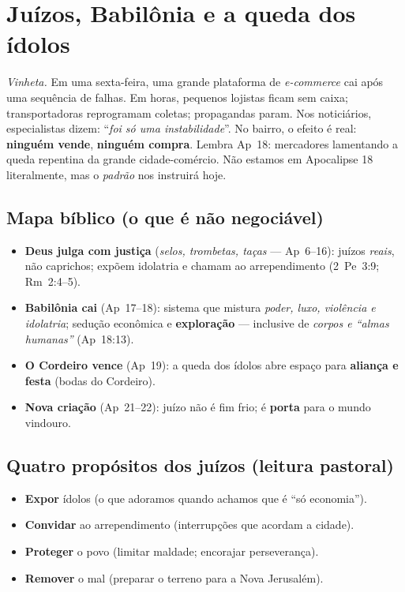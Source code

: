 \chapter{Juízos, Babilônia e a queda dos ídolos}
\noindent\textit{Vinheta.} Em uma sexta-feira, uma grande plataforma de \emph{e-commerce} cai após uma sequência de falhas. Em horas, pequenos lojistas ficam sem caixa; transportadoras reprogramam coletas; propagandas param. Nos noticiários, especialistas dizem: ``\emph{foi só uma instabilidade}''. No bairro, o efeito é real: \textbf{ninguém vende}, \textbf{ninguém compra}. Lembra Ap~18: mercadores lamentando a queda repentina da grande cidade-comércio. Não estamos em Apocalipse 18 literalmente, mas o \emph{padrão} nos instruirá hoje.

\section{Mapa bíblico (o que é não negociável)}
\begin{itemize}[leftmargin=*,noitemsep]
  \item \textbf{Deus julga com justiça} (\emph{selos, trombetas, taças} — Ap~6--16): juízos \emph{reais}, não caprichos; expõem idolatria e chamam ao arrependimento (2~Pe~3:9; Rm~2:4--5).
  \item \textbf{Babilônia cai} (Ap~17--18): sistema que mistura \emph{poder, luxo, violência e idolatria}; sedução econômica e \textbf{exploração} — inclusive de \emph{corpos e “almas humanas”} (Ap~18:13).
  \item \textbf{O Cordeiro vence} (Ap~19): a queda dos ídolos abre espaço para \textbf{aliança e festa} (bodas do Cordeiro).
  \item \textbf{Nova criação} (Ap~21--22): juízo não é fim frio; é \textbf{porta} para o mundo vindouro.
\end{itemize}

\section{Quatro propósitos dos juízos (leitura pastoral)}
\begin{checklist}
\begin{itemize}[leftmargin=*,noitemsep]
  \item \textbf{Expor} ídolos (o que adoramos quando achamos que é “só economia”).
  \item \textbf{Convidar} ao arrependimento (interrupções que acordam a cidade).
  \item \textbf{Proteger} o povo (limitar maldade; encorajar perseverança).
  \item \textbf{Remover} o mal (preparar o terreno para a Nova Jerusalém).
\end{itemize}
\end{checklist}

